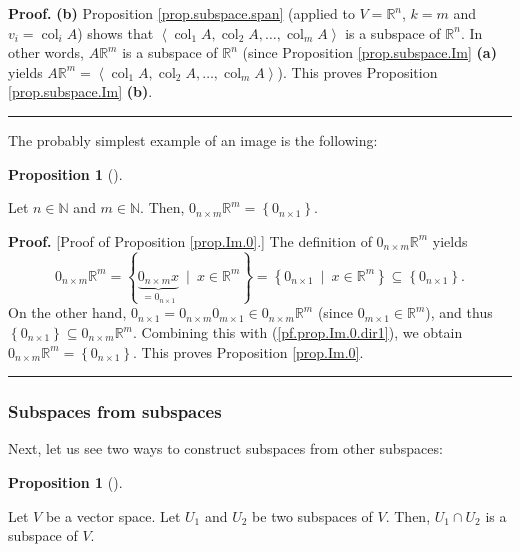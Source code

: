 \documentclass[numbers=enddot,12pt,final,onecolumn,notitlepage]{scrartcl}%
\theoremstyle{definition}
\newtheorem{prop}[theo]{Proposition}
\newenvironment{proposition}[1][]
{\begin{prop}[#1]\begin{leftbar}}
{\end{leftbar}\end{prop}}
\newenvironment{proof}[1][Proof]{\noindent\textbf{#1.} }{\ \rule{0.5em}{0.5em}}
\begin{document}
\begin{proof}
\textbf{(b)} Proposition \ref{prop.subspace.span} (applied to $V=\mathbb{R}%
^{n}$, $k=m$ and $v_{i}=\operatorname*{col}\nolimits_{i}A$) shows that
$\left\langle \operatorname*{col}\nolimits_{1}A,\operatorname*{col}%
\nolimits_{2}A,\ldots,\operatorname*{col}\nolimits_{m}A\right\rangle $ is a
subspace of $\mathbb{R}^{n}$. In other words, $A\mathbb{R}^{m}$ is a subspace
of $\mathbb{R}^{n}$ (since Proposition \ref{prop.subspace.Im} \textbf{(a)}
yields $A\mathbb{R}^{m}=\left\langle \operatorname*{col}\nolimits_{1}%
A,\operatorname*{col}\nolimits_{2}A,\ldots,\operatorname*{col}\nolimits_{m}%
A\right\rangle $). This proves Proposition \ref{prop.subspace.Im} \textbf{(b)}.
\end{proof}

The probably simplest example of an image is the following:

\begin{proposition}
\label{prop.Im.0}Let $n\in\mathbb{N}$ and $m\in\mathbb{N}$. Then, $0_{n\times
m}\mathbb{R}^{m}=\left\{  0_{n\times1}\right\}  $.
\end{proposition}

\begin{proof}
[Proof of Proposition \ref{prop.Im.0}.] The definition of $0_{n\times
m}\mathbb{R}^{m}$ yields
\begin{equation}
0_{n\times m}\mathbb{R}^{m}=\left\{  \underbrace{0_{n\times m}x}%
_{=0_{n\times1}}\ \mid\ x\in\mathbb{R}^{m}\right\}  =\left\{  0_{n\times
1}\ \mid\ x\in\mathbb{R}^{m}\right\}  \subseteq\left\{  0_{n\times1}\right\}
.\label{pf.prop.Im.0.dir1}%
\end{equation}
On the other hand, $0_{n\times1}=0_{n\times m}0_{m\times1}\in0_{n\times
m}\mathbb{R}^{m}$ (since $0_{m\times1}\in\mathbb{R}^{m}$), and thus $\left\{
0_{n\times1}\right\}  \subseteq0_{n\times m}\mathbb{R}^{m}$. Combining this
with (\ref{pf.prop.Im.0.dir1}), we obtain $0_{n\times m}\mathbb{R}%
^{m}=\left\{  0_{n\times1}\right\}  $. This proves Proposition \ref{prop.Im.0}.
\end{proof}

\subsubsection{Subspaces from subspaces}

Next, let us see two ways to construct subspaces from other subspaces:

\begin{proposition}
\label{prop.subspace.inter}Let $V$ be a vector space. Let $U_{1}$ and $U_{2}$
be two subspaces of $V$. Then, $U_{1}\cap U_{2}$ is a subspace of $V$.
\end{proposition}
\end{document}
